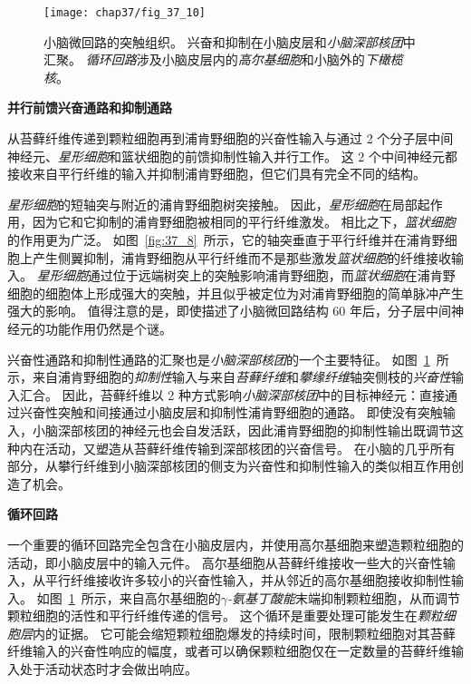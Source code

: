 \begin{figure}[htbp]
	\centering
	\texttt{[image: chap37/fig\_37\_10]}
	\caption{小脑微回路的突触组织。
		兴奋和抑制在小脑皮层和\textit{小脑深部核团}中汇聚。
		\textit{循环回路}涉及小脑皮层内的\textit{高尔基细胞}和小脑外的\textit{下橄榄核}\cite{raymond1996cerebellum}。}
	\label{fig:37_10}
\end{figure}


\textbf{并行前馈兴奋通路和抑制通路}


从苔藓纤维传递到颗粒细胞再到浦肯野细胞的兴奋性输入与通过 2 个分子层中间神经元、\textit{星形细胞}和篮状细胞的前馈抑制性输入并行工作。
这 2 个中间神经元都接收来自平行纤维的输入并抑制浦肯野细胞，但它们具有完全不同的结构。


\textit{星形细胞}的短轴突与附近的浦肯野细胞树突接触。
因此，\textit{星形细胞}在局部起作用，因为它和它抑制的浦肯野细胞被相同的平行纤维激发。
相比之下，\textit{篮状细胞}的作用更为广泛。
如图~\ref{fig:37_8}~所示，它的轴突垂直于平行纤维并在浦肯野细胞上产生侧翼抑制，浦肯野细胞从平行纤维而不是那些激发\textit{篮状细胞}的纤维接收输入。
\textit{星形细胞}通过位于远端树突上的突触影响浦肯野细胞，而\textit{篮状细胞}在浦肯野细胞的细胞体上形成强大的突触，并且似乎被定位为对浦肯野细胞的简单脉冲产生强大的影响。
值得注意的是，即使描述了小脑微回路结构 60 年后，分子层中间神经元的功能作用仍然是个谜。


兴奋性通路和抑制性通路的汇聚也是\textit{小脑深部核团}的一个主要特征。
如图~\ref{fig:37_10}~所示，来自浦肯野细胞的\textit{抑制性}输入与来自\textit{苔藓纤维}和\textit{攀缘纤维}轴突侧枝的\textit{兴奋性}输入汇合。
因此，苔藓纤维以 2 种方式影响\textit{小脑深部核团}中的目标神经元：直接通过兴奋性突触和间接通过小脑皮层和抑制性浦肯野细胞的通路。
即使没有突触输入，小脑深部核团的神经元也会自发活跃，因此浦肯野细胞的抑制性输出既调节这种内在活动，又塑造从苔藓纤维传输到深部核团的兴奋信号。
在小脑的几乎所有部分，从攀行纤维到小脑深部核团的侧支为兴奋性和抑制性输入的类似相互作用创造了机会。



\textbf{循环回路}

一个重要的循环回路完全包含在小脑皮层内，并使用高尔基细胞来塑造颗粒细胞的活动，即小脑皮层中的输入元件。
高尔基细胞从苔藓纤维接收一些大的兴奋性输入，从平行纤维接收许多较小的兴奋性输入，并从邻近的高尔基细胞接收抑制性输入。
如图~\ref{fig:37_10}~所示，来自高尔基细胞的\textit{$\gamma$-氨基丁酸能}末端抑制颗粒细胞，从而调节颗粒细胞的活性和平行纤维传递的信号。
这个循环是重要处理可能发生在\textit{颗粒细胞层}内的证据。
它可能会缩短颗粒细胞爆发的持续时间，限制颗粒细胞对其苔藓纤维输入的兴奋性响应的幅度，或者可以确保颗粒细胞仅在一定数量的苔藓纤维输入处于活动状态时才会做出响应。


